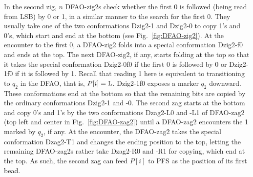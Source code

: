In the second zig, $n$ DFAO-zig2s check whether the first 0 is followed (being read from LSB) by 0 or 1, in a similar manner to the search for the first 0.
They usually take one of the two conformations Dzig2-1 and Dzig2-0 to copy 1's and 0's, which start and end at the bottom (see Fig.~\ref{fig:DFAO-zig2}). 
At the encounter to the first 0, a DFAO-zig2 folds into a special conformation Dzig2-f0 and ends at the top. 
The next DFAO-zig2, if any, starts folding at the top so that it takes the special conformation Dzig2-0f0 if the first 0 is followed by 0 or Dzig2-1f0 if it is followed by 1. 
Recall that reading 1 here is equivalent to transitioning to $q_2$ in the DFAO, that is, $P[i] = {\rm L}$. 
Dzig2-1f0 exposes a marker $q_2$ downward. 
These conformations end at the bottom so that the remaining bits are copied by the ordinary conformations Dzig2-1 and -0. 
The second zag starts at the bottom and copy 0's and 1's by the two conformations Dzag2-L0 and -L1 of DFAO-zag2 (top left and center in Fig.~\ref{fig:DFAO-zag2}) until a DFAO-zag2 encounters the 1 marked by $q_2$, if any. 
At the encounter, the DFAO-zag2 takes the special conformation Dzag2-T1 and changes the ending position to the top, letting the remaining DFAO-zag2s rather take Dzag2-R0 and -R1 for copying, which end at the top.
As such, the second zag can feed $P[i]$ to PFS as the position of its first bead.




